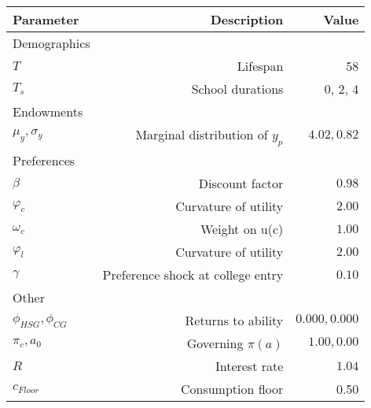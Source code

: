 \begin{tabular}{lrr}
\hline
Parameter & Description  & Value  \\
\hline
Demographics &   &   \\
$T$ & Lifespan  & 58  \\
$T_{s}$ & School durations  & 0, 2, 4  \\
Endowments &   &   \\
$\mu_{y}, \sigma_{y}$ & Marginal distribution of $y_{p}$  & $4.02, 0.82$  \\
Preferences &   &   \\
$\beta$ & Discount factor  & $0.98$  \\
$\varphi_{c}$ & Curvature of utility  & $2.00$  \\
$\omega_{c}$ & Weight on u(c)  & $1.00$  \\
$\varphi_{l}$ & Curvature of utility  & $2.00$  \\
$\gamma$ & Preference shock at college entry  & $0.10$  \\
Other &   &   \\
$\phi_{HSG}, \phi_{CG}$ & Returns to ability  & $0.000, 0.000$  \\
$\pi_{c}, a_{0}$ & Governing $\pi(a)$  & $1.00, 0.00$  \\
$R$ & Interest rate  & $1.04$  \\
$c_{Floor}$ & Consumption floor  & 0.50  \\
\hline
\end{tabular}%
